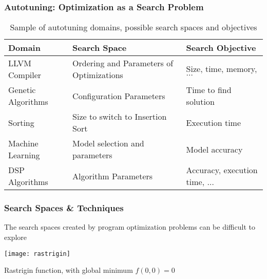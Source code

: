 \documentclass[10pt, compress, aspectratio=169]{beamer}
\begin{document}
\begin{frame}
    \frametitle{Autotuning: Optimization as a Search Problem}
    \begin{table}[]
        \centering
        \begin{tabular}{@{}lll@{}}
            \toprule
            Domain & Search Space & Search Objective \\ \midrule
            LLVM Compiler & Ordering and Parameters of Optimizations & Size, time, memory, $\dots$ \\
            Genetic Algorithms & Configuration Parameters & Time to find solution \\
            Sorting & Size to switch to Insertion Sort & Execution time \\
            Machine Learning & Model selection and parameters & Model accuracy \\
            DSP Algorithms & Algorithm Parameters & Accuracy, execution time, $\dots$ \\ \bottomrule
        \end{tabular}
        \caption{Sample of autotuning domains, possible search spaces and objectives}
    \end{table}
\end{frame}

\begin{frame}
    \frametitle{Search Spaces \& Techniques}
    The \alert{search spaces} created by program optimization problems can be
    \alert{difficult to explore}

    \begin{center}
        \texttt{[image: rastrigin]}

        Rastrigin function, with \alert{global minimum} $f(0,0) = 0$
    \end{center}
\end{frame}
\end{document}
